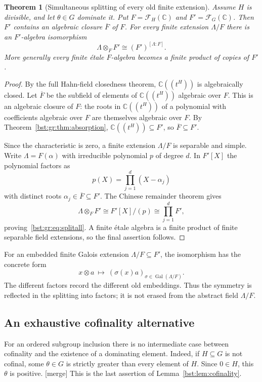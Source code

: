 \documentclass[11pt,letterpaper]{article}
\newtheorem{theorem}{Theorem}[section]
\theoremstyle{definition}
\theoremstyle{remark}
\newcommand{\C}{\mathbb C}
\newcommand{\HH}[2]{#1((t^{#2}))}
\newcommand{\FF}[2]{\mathcal F_{#2}(#1)}
\newcommand{\Gal}{\operatorname{Gal}}
\begin{document}
\begin{theorem}[Simultaneous splitting of every old finite extension]\label{bst:gr:thm:allcollapse}
Assume $H$ is divisible, and let $\theta\in G$ dominate it. Put
$F=\FF{\C}H$ and $F'=\FF{\C}G$. Then $F'$ contains an algebraic closure
$\overline F$ of $F$. For every finite extension $\Lambda/F$ there is an
$F'$-algebra isomorphism
\begin{equation}\label{bst:gr:eq:splitall}
 \Lambda\otimes_FF'\cong(F')^{[\Lambda:F]}.
\end{equation}
More generally every finite \emph{\'etale} $F$-algebra becomes a finite
product of copies of $F'$.
\end{theorem}
\begin{proof}
By the full Hahn-field closedness theorem, $\HH{\C}H$ is algebraically
closed. Let $\overline F$ be the subfield of elements of $\HH{\C}H$ algebraic
over $F$. This is an algebraic closure of $F$: the roots in $\HH{\C}H$ of a
polynomial with coefficients algebraic over $F$ are themselves algebraic
over $F$. By Theorem~\ref{bst:gr:thm:absorption}, $\HH{\C}H\subseteq F'$, so
$\overline F\subseteq F'$.

Since the characteristic is zero, a finite extension $\Lambda/F$ is separable
and simple. Write $\Lambda=F(\alpha)$ with irreducible polynomial $p$ of
degree $d$. In $F'[X]$ the polynomial factors as
\[
 p(X)=\prod_{j=1}^d(X-\alpha_j)
\]
with distinct roots $\alpha_j\in\overline F\subseteq F'$. The Chinese
remainder theorem gives
\[
 \Lambda\otimes_FF'\cong F'[X]/(p)\cong\prod_{j=1}^dF',
\]
proving~\eqref{bst:gr:eq:splitall}. A finite \'etale algebra is a finite
product of finite separable field extensions, so the final assertion
follows.
\end{proof}

For an embedded finite Galois extension $\Lambda/F\subseteq F'$, the
isomorphism has the concrete form
\[
 x\otimes a\ \longmapsto\ (\sigma(x)a)_{\sigma\in\Gal(\Lambda/F)}.
\]
The different factors record the different old embeddings. Thus the
symmetry is reflected in the splitting into factors; it is not erased from
the abstract field $\Lambda/F$.

\subsection{An exhaustive cofinality alternative}

For an ordered subgroup inclusion there is no intermediate case between
cofinality and the existence of a dominating element. Indeed, if
$H\subseteq G$ is not cofinal, some $\theta\in G$ is strictly greater than
every element of $H$. Since $0\in H$, this $\theta$ is positive.
\textup{[merge]} This is the last assertion of Lemma~\ref{bst:lem:cofinality}.
\end{document}
